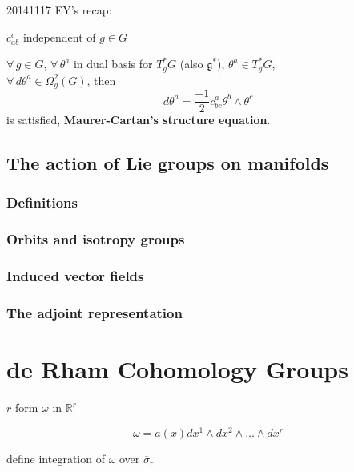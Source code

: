 \documentclass[twoside]{amsart}
\begin{document}
\hrulefill

20141117 EY's recap:

$c^{c}_{ab}$ independent of $g \in G$

$\forall \, g\in G$, $\forall \, \theta^a$ in dual basis for $T_g^*G$ (also $\mathfrak{g}^*$), $\theta^a \in T_g^*G$, \\
$\forall \, d\theta^a \in \Omega^2_g(G)$, then 
\[
d\theta^a = \frac{-1}{2} c^a_{bc} \theta^b \wedge \theta^c
\]
is satisfied, \textbf{Maurer-Cartan's structure equation}.


\hrulefill


\subsection{ The action of Lie groups on manifolds }




\subsubsection{ Definitions} 


\subsubsection{ Orbits and isotropy groups }


\subsubsection{ Induced vector fields }

\subsubsection{ The adjoint representation }














\section{de Rham Cohomology Groups}

$r$-form $\omega$ in $\mathbb{R}^r$

\[
\omega = a(x) dx^1 \wedge dx^2 \wedge \dots \wedge dx^r
\]

define integration of $\omega$ over $\overline{\sigma}_r$ 
\end{document}
